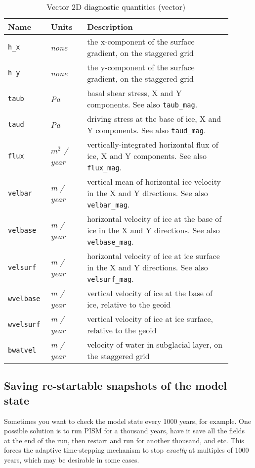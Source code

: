 \begin{table}[ht]
  \centering
  \begin{tabular}{p{0.15\linewidth}p{0.15\linewidth}p{0.6\linewidth}}
    \toprule
    \textbf{Name} & \textbf{Units} & \textbf{Description} \\
    \midrule
    \texttt{h_x} & \textsl{none} &  the x-component of the surface gradient, on the staggered grid\\
    \texttt{h_y} & \textsl{none} &  the y-component of the surface gradient, on the staggered grid\\
    \texttt{taub} & \textsl{Pa} & basal shear stress, X and Y components. See also \texttt{taub_mag}. \\
    \texttt{taud} & \textsl{Pa} & driving stress at the base of ice, X and Y components. See also \texttt{taud_mag}. \\
    \texttt{flux} & \textsl{$m^{2}$ / year} & vertically-integrated horizontal flux of ice, X and Y components. See also \texttt{flux_mag}. \\
    \texttt{velbar} & \textsl{m / year} &  vertical mean of horizontal ice velocity in the X and Y directions. See also \texttt{velbar_mag}. \\
    \texttt{velbase} & \textsl{m / year} &  horizontal velocity of ice at the base of ice in the X and Y directions. See also \texttt{velbase_mag}. \\
    \texttt{velsurf} & \textsl{m / year} &  horizontal velocity of ice at ice surface in the X and Y directions. See also \texttt{velsurf_mag}.\\
    \texttt{wvelbase} & \textsl{m / year} &  vertical velocity of ice at the base of ice, relative to the geoid \\
    \texttt{wvelsurf} & \textsl{m / year} &  vertical velocity of ice at ice surface, relative to the geoid \\
    \texttt{bwatvel} & \textsl{m / year} & velocity of water in subglacial layer, on the staggered grid\\
    \bottomrule
  \end{tabular}
  \caption{Vector 2D diagnostic quantities (vector)}
  \label{tab:two-d-diagnostics-vector}
\end{table}

\clearpage

\subsection{Saving re-startable snapshots of the model state}
\label{sec:snapshots}
Sometimes you want to check the model state every 1000 years, for example.  One possible solution is to run PISM for a thousand years, have it save all the fields at the end of the run, then restart and run for another thousand, and etc.  This forces the adaptive time-stepping mechanism to stop \emph{exactly} at multiples of 1000 years, which may be desirable in some cases.

